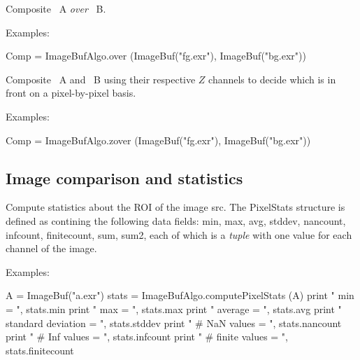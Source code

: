  

Composite \ImageBuf\ {\cf A} \emph{over} \ImageBuf\ {\cf B}.

\smallskip
\noindent Examples:
\begin{code}
    Comp = ImageBufAlgo.over (ImageBuf("fg.exr"), ImageBuf("bg.exr"))
\end{code}
\apiend


 

Composite \ImageBuf\ {\cf A} and \ImageBuf\ {\cf B} using their respective
$Z$ channels to decide which is in front on a pixel-by-pixel basis.

\smallskip
\noindent Examples:
\begin{code}
    Comp = ImageBufAlgo.zover (ImageBuf("fg.exr"), ImageBuf("bg.exr"))
\end{code}
\apiend



\subsection{Image comparison and statistics}
\label{sec:iba:py:stats}


 

Compute statistics about the ROI of the image {\cf src}.
The {\cf PixelStats} structure is defined as contining the following
data fields: {\cf min}, {\cf max}, {\cf avg}, {\cf stddev},
{\cf nancount}, {\cf infcount}, {\cf finitecount}, {\cf sum}, {\cf sum2},
each of which is a \emph{tuple} with one value for each channel of the image.

\smallskip
\noindent Examples:
\begin{code}
    A = ImageBuf("a.exr")
    stats = ImageBufAlgo.computePixelStats (A)
    print "   min = ", stats.min
    print "   max = ", stats.max
    print "   average = ", stats.avg
    print "   standard deviation  = ", stats.stddev
    print "   # NaN values    = ", stats.nancount
    print "   # Inf values    = ", stats.infcount
    print "   # finite values = ", stats.finitecount
\end{code}
\apiend


